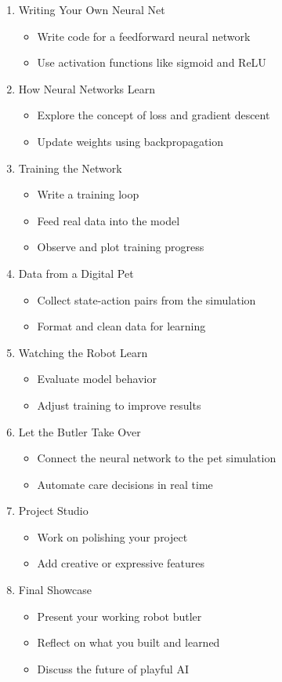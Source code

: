 \documentclass[10pt]{book}
\begin{document}
\begin{enumerate}[LO 1., itemindent=2em]
\item Writing Your Own Neural Net
\begin{itemize}
  \item Write code for a feedforward neural network
  \item Use activation functions like sigmoid and ReLU
\end{itemize}


\item How Neural Networks Learn
\begin{itemize}
  \item Explore the concept of loss and gradient descent
  \item Update weights using backpropagation
\end{itemize}

\item
Training the Network
\begin{itemize}
  \item Write a training loop
  \item Feed real data into the model
  \item Observe and plot training progress
\end{itemize}

\item
Data from a Digital Pet
\begin{itemize}
  \item Collect state-action pairs from the simulation
  \item Format and clean data for learning
\end{itemize}

\item
Watching the Robot Learn
\begin{itemize}
  \item Evaluate model behavior
  \item Adjust training to improve results
\end{itemize}

\item Let the Butler Take Over
\begin{itemize}
  \item Connect the neural network to the pet simulation
  \item Automate care decisions in real time
\end{itemize}

\item
 Project Studio
\begin{itemize}
  \item Work on polishing your project
  \item Add creative or expressive features
\end{itemize}

\item Final Showcase
\begin{itemize}
  \item Present your working robot butler
  \item Reflect on what you built and learned
  \item Discuss the future of playful AI
\end{itemize}
\end{enumerate}
\end{document}
